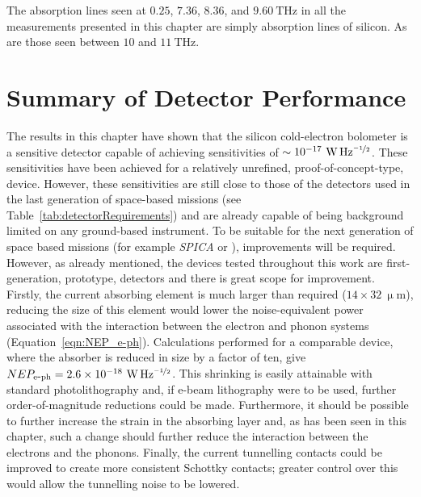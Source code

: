 \par 
The absorption lines seen at $0.25$, $7.36$, $8.36$, and $9.60~\mathrm{THz}$ in all the measurements presented in this chapter are simply absorption lines of silicon. As are those seen between $10$ and $11~\mathrm{THz}$.
%
\section{Summary of Detector Performance}
The results in this chapter have shown that the silicon cold-electron bolometer is a sensitive detector capable of achieving sensitivities of $\sim 10^{-17}~\mathrm{W\,Hz^{\nicefrac{-1}{2}}}$. These sensitivities have been achieved for a relatively unrefined, proof-of-concept-type, device. However, these sensitivities are still close to those of the detectors used in the last generation of space-based missions (see Table~\ref{tab:detectorRequirements}) and are already capable of being background limited on any ground-based instrument. To be suitable for the next generation of space based missions (for example \textit{SPICA} or ), improvements will be required. However, as already mentioned, the devices tested throughout this work are first-generation, prototype, detectors and there is great scope for improvement. Firstly, the current absorbing element is much larger than required ($14 \times 32~\mathrm{\upmu m}$), reducing the size of this element would lower the noise-equivalent power associated with the interaction between the electron and phonon systems (Equation~\ref{eqn:NEP_e-ph}). Calculations performed for a comparable device, where the absorber is reduced in size by a factor of ten, give $NEP_{\mathrm{e\mbox{-}ph}} = 2.6 \times 10^{-18}~\mathrm{W\,Hz^{\nicefrac{-1}{2}}}$. This shrinking is easily attainable with standard photolithography and, if e-beam lithography were to be used, further order-of-magnitude reductions could be made. Furthermore, it should be possible to further increase the strain in the absorbing layer and, as has been seen in this chapter, such a change should further reduce the interaction between the electrons and the phonons. Finally, the current tunnelling contacts could be improved to create more consistent Schottky contacts; greater control over this would allow the tunnelling noise to be lowered.

